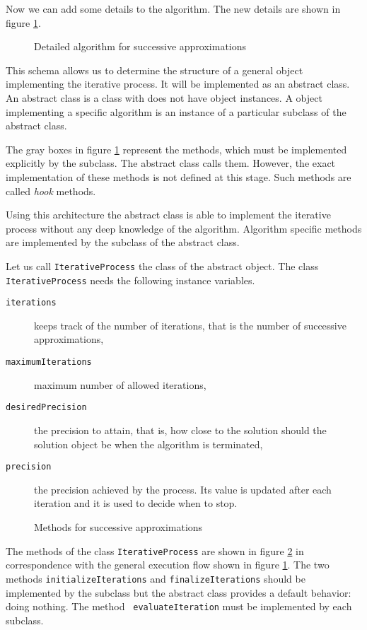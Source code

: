 \documentclass[twoside]{book}
\begin{document}
 Now we can add some details to the
algorithm. The new details are shown in figure \ref{fig:iterfine}.
\begin{figure}
\center{}
\caption{Detailed algorithm for successive
approximations}\label{fig:iterfine}
\end{figure}
This schema allows us to determine the structure of a general
object implementing the iterative process. It will be implemented
as an abstract class. An abstract class is a class with does not
have object instances. A object implementing a specific algorithm
is an instance of a particular subclass of the abstract class.

The gray boxes in figure \ref{fig:iterfine} represent the methods,
which must be implemented explicitly by the subclass. The abstract
class calls them. However, the exact implementation of these
methods is not defined at this stage. Such methods are called {\sl
hook} methods.

Using this architecture the abstract class is able to implement
the iterative process without any deep knowledge of the algorithm.
Algorithm specific methods are implemented by the subclass of the
abstract class.

Let us call {\tt IterativeProcess} the class of the abstract
object. The class {\tt IterativeProcess} needs the following
instance variables.
\begin{description}
\item[{\tt iterations}] keeps track of the number of iterations, that is the number of successive
approximations,
\item[{\tt maximumIterations}] maximum number of allowed iterations,
\item[{\tt desiredPrecision}] the precision to attain, that is, how close to the solution should the solution object be when the algorithm is
terminated,
\item[{\tt precision}] the precision achieved by the process. Its value is updated after each iteration and it is used to decide when to stop.
\end{description}
\begin{figure}
\center{}
\caption{Methods for successive
approximations}\label{fig:itermeth}
\end{figure}
The methods of the class {\tt IterativeProcess} are shown in
figure \ref{fig:itermeth} in correspondence with the general
execution flow shown in figure \ref{fig:iterfine}. The two methods
{\tt initializeIterations} and {\tt finalizeIterations} should be
implemented by the subclass but the abstract class provides a
default behavior: doing nothing. The method {\tt
evaluateIteration} must be implemented by each subclass.
\end{document}
